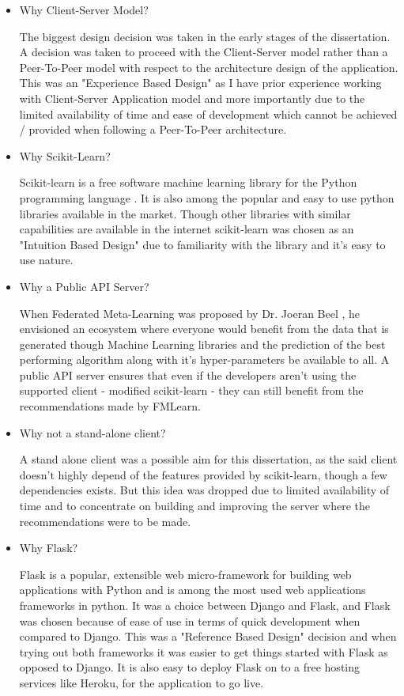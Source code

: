 \begin{itemize}
    \item Why Client-Server Model?
    
    The biggest design decision was taken in the early stages of the dissertation. A decision was taken to proceed with the Client-Server model rather than a Peer-To-Peer model with respect to the architecture design of the application. This was an "Experience Based Design" as I have prior experience working with Client-Server Application model and more importantly due to the limited availability of time and ease of development which cannot be achieved / provided when following a Peer-To-Peer architecture.

    \item Why Scikit-Learn?
    
    Scikit-learn is a free software machine learning library for the Python programming language \citep{scikit-learn}. It is also among the popular and easy to use python libraries available in the market. Though other libraries with similar capabilities are available in the internet scikit-learn was chosen as an "Intuition Based Design" due to familiarity with the library and it's easy to use nature.
    
    \item Why a Public API Server?
    
    When Federated Meta-Learning was proposed by Dr. Joeran Beel \citep{fml}, he envisioned an ecosystem where everyone would benefit from the data that is generated though Machine Learning libraries and the prediction of the best performing algorithm along with it's hyper-parameters be available to all. A public API server ensures that even if the developers aren't using the supported client - modified scikit-learn - they can still benefit from the recommendations made by FMLearn.
    
    \item Why not a stand-alone client?
    
    A stand alone client was a possible aim for this dissertation, as the said client doesn't highly depend of the features provided by scikit-learn, though a few dependencies exists. But this idea was dropped due to limited availability of time and to concentrate on building and improving the server where the recommendations were to be made.
    
    \item Why Flask?
    
    Flask is a popular, extensible web micro-framework for building web applications with Python \citep{flask} and is among the most used web applications frameworks in python. It was a choice between Django and Flask, and Flask was chosen because of ease of use in terms of quick development when compared to Django. This was a "Reference Based Design" decision and when trying out both frameworks it was easier to get things started with Flask as opposed to Django. It is also easy to deploy Flask on to a free hosting services like Heroku, for the application to go live.
    

\end{itemize}
